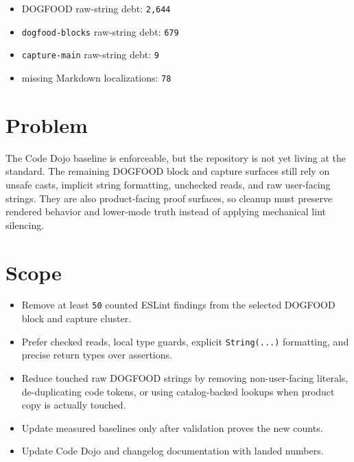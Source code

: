 \begin{itemize}
\item
  DOGFOOD raw-string debt: \texttt{2\allowbreak{},\allowbreak{}6\allowbreak{}4\allowbreak{}4}
\item
  \texttt{d\allowbreak{}o\allowbreak{}g\allowbreak{}f\allowbreak{}o\allowbreak{}o\allowbreak{}d\allowbreak{}-\allowbreak{}b\allowbreak{}l\allowbreak{}o\allowbreak{}c\allowbreak{}k\allowbreak{}s} raw-string debt: \texttt{6\allowbreak{}7\allowbreak{}9}
\item
  \texttt{c\allowbreak{}a\allowbreak{}p\allowbreak{}t\allowbreak{}u\allowbreak{}r\allowbreak{}e\allowbreak{}-\allowbreak{}m\allowbreak{}a\allowbreak{}i\allowbreak{}n} raw-string debt: \texttt{9}
\item
  missing Markdown localizations: \texttt{7\allowbreak{}8}
\end{itemize}

\section{Problem}\label{record-199-problem}

The Code Dojo baseline is enforceable, but the repository is not yet living at the standard. The remaining DOGFOOD block and capture surfaces still rely on unsafe casts, implicit string formatting, unchecked reads, and raw user-facing strings. They are also product-facing proof surfaces, so cleanup must preserve rendered behavior and lower-mode truth instead of applying mechanical lint silencing.

\section{Scope}\label{record-199-scope}

\begin{itemize}
\tightlist
\item
  Remove at least \texttt{5\allowbreak{}0} counted ESLint findings from the selected DOGFOOD block and capture cluster.
\item
  Prefer checked reads, local type guards, explicit \texttt{S\allowbreak{}t\allowbreak{}r\allowbreak{}i\allowbreak{}n\allowbreak{}g\allowbreak{}(\allowbreak{}.\allowbreak{}.\allowbreak{}.\allowbreak{})} formatting, and precise return types over assertions.
\item
  Reduce touched raw DOGFOOD strings by removing non-user-facing literals, de-duplicating code tokens, or using catalog-backed lookups when product copy is actually touched.
\item
  Update measured baselines only after validation proves the new counts.
\item
  Update Code Dojo and changelog documentation with landed numbers.
\end{itemize}

